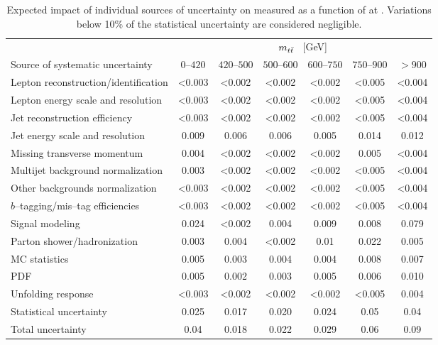 \begin{table}[!htbp]\centering
\begin{tabular}{l c c c c c c}
\toprule
 &\multicolumn{6}{c}{$m_{t\bar{t}}{}$ ~[GeV]} \\
Source of systematic uncertainty&$0$--$420$&$420$--$500$&$500$--$600$&$600$--$750$&$750$--$900$&$>900$ \\
\midrule
Lepton reconstruction/identification & <0.003 & <0.002 & <0.002 & <0.002 & <0.005 & <0.004\\
Lepton energy scale and resolution & <0.003 & <0.002 & <0.002 & <0.002 & <0.005 & <0.004 \\
Jet reconstruction efficiency & <0.003 & <0.002 & <0.002 & <0.002 & <0.005 & <0.004  \\
Jet energy scale and resolution & 0.009 & 0.006 & 0.006 & 0.005 & 0.014 & 0.012 \\
Missing transverse momentum & 0.004 & <0.002 & <0.002 & <0.002 & 0.005 & <0.004  \\
Multijet background normalization & 0.003 & <0.002 & <0.002 & <0.002 & <0.005 & <0.004  \\
Other backgrounds normalization & <0.003 & <0.002 & <0.002 & <0.002 & <0.005 & <0.004  \\
$b$--tagging/mis--tag efficiencies & <0.003 & <0.002 & <0.002 & <0.002 & <0.005 & <0.004  \\
Signal modeling & 0.024 & <0.002 & 0.004 & 0.009 & 0.008  & 0.079 \\
Parton shower/hadronization & 0.003 & 0.004 & <0.002 & 0.01 & 0.022 &0.005 \\
MC statistics & 0.005 & 0.003 & 0.004 & 0.004 & 0.008 & 0.007\\
PDF & 0.005 &0.002 & 0.003 & 0.005 & 0.006 & 0.010\\
Unfolding response & <0.003  & <0.002 & <0.002  & <0.002 & <0.005  & 0.004\\
\midrule
Statistical uncertainty & 0.025 & 0.017 & 0.020 & 0.024 & 0.05 & 0.04\\
\midrule
Total uncertainty  & 0.04 & 0.018 & 0.022 & 0.029 & 0.06 & 0.09\\
\bottomrule
\end{tabular}
\caption{Expected impact of individual sources of uncertainty on 
  \ac{} measured as a function of \mtt{} at \seventev{}. Variations below 10\%
  of the statistical uncertainty are considered negligible.}
\label{table:Systematics_mtt8tev}
\end{table}
